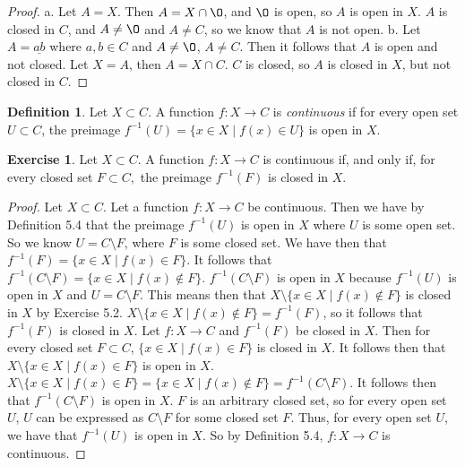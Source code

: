 \documentclass[12pt]{article}
\renewcommand{\emptyset}{\O}
\providecommand{\arr}{\to}
\renewcommand{\_}[1]{\underline{ #1 }}
\theoremstyle{definition}
\newtheorem{definition}[theorem]{Definition}
\newtheorem{exercise}[theorem]{Exercise}
\numberwithin{equation}{subsection}
\begin{document}
\begin{proof}
a. Let $A = X$. Then $A = X \cap \emptyset$, and $\emptyset$ is open, so $A$ is open in $X$. $A$ is closed in $C$, and $A \not = \emptyset$ and $A \not = C$, so we know that $A$ is not open.
\newline b. Let $A = \_{ab}$ where $a, b \in C$ and $A \not = \emptyset$, $A \not = C$. Then it follows that $A$ is open and not closed. Let $X = A$, then $A = X \cap C$. $C$ is closed, so $A$ is closed in $X$, but not closed in $C$. 
\end{proof}

\begin{definition}  Let $X\subset C$. A function $f \colon X \arr C$ is \emph{continuous} if for every open set $U \subset C$, the preimage $f^{-1}(U) = \{x \in X \mid f(x) \in U \}$ is open in $X$.
\end{definition}

\begin{exercise}\label{preimage-closed}
Let $X\subset C$. A function  $f\colon X\arr C$ is continuous if, and only if, for every closed set $F\subset C,$ the preimage $f^{-1}(F)$ is closed in $X$.
\end{exercise}

\begin{proof}
Let $X \subset C$. Let a function $f : X \to C$ be continuous. Then we have by Definition 5.4 that the preimage $f^{-1}(U)$ is open in $X$ where $U$ is some open set. So we know $U = C \setminus F$, where $F$ is some closed set. We have then that $f^{-1}(F) = \{x \in X \mid f(x) \in F\}$. It follows that $f^{-1}(C \setminus F) = \{x \in X \mid f(x) \not \in F\}$. $f^{-1}(C \setminus F)$ is open in $X$ because $f^{-1}(U)$ is open in $X$ and $U = C \setminus F$. This means then that $X \setminus \{x \in X \mid f(x) \not \in F\}$ is closed in $X$ by Exercise 5.2. $X \setminus \{x \in X \mid f(x) \not \in F\} = f^{-1}(F)$, so it follows that $f^{-1}(F)$ is closed in $X$. \newline
Let $f : X \to C$ and $f^{-1}(F)$ be closed in $X$. Then for every closed set $F \subset C$, $\{x \in X \mid f(x) \in F\}$ is closed in $X$. It follows then that $X \setminus \{x \in X \mid f(x) \in F\}$ is open in $X$. $X \setminus \{x \in X \mid f(x) \in F\} = \{ x \in X \mid f(x) \not \in F\} = f^{-1}(C \setminus F)$. It follows then that $f^{-1}(C \setminus F)$ is open in $X$. $F$ is an arbitrary closed set, so for every open set $U$, $U$ can be expressed as $C \setminus F$ for some closed set $F$. Thus, for every open set $U$, we have that $f^{-1}(U)$ is open in $X$. So by Definition 5.4, $f : X \to C$ is continuous.
\end{proof}
\end{document}
